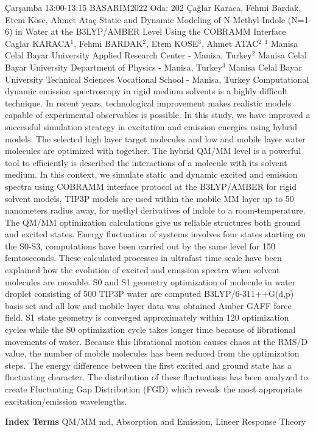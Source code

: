 
    \begin{abstract_basarim}
    {Çarşamba 13:00-13:15}
    {BASARIM2022}
    {Oda: 202}
    {Çağlar Karaca, Fehmi Bardak, Etem Köse, Ahmet Ataç}
    {Static and Dynamic Modeling of N-Methyl-Indole \newline\noindent (N=1-6) in Water at the B3LYP/AMBER Level Using the COBRAMM Interface}
    {%
    Caglar KARACA$^{1}$, Fehmi BARDAK$^{2}$, Etem KOSE$^{3}$, Ahmet ATAC$^{2}$}
    {%
    }
    {%
    $^1$ Manisa Celal Bayar University Applied Research Center - Manisa, Turkey\newline{}$^2$ Manisa Celal Bayar University Department of Physics - Manisa, Turkey\newline{}$^3$ Manisa Celal Bayar University Technical Sciences Vocational School - Manisa, Turkey}
    Computational dynamic emission spectroscopy in rigid medium solvents is a highly difficult technique. In recent years, technological improvement makes realistic models capable of experimental observables is possible. In this study, we have improved a successful simulation strategy in excitation and emission energies using hybrid models. The selected high layer target molecules and low and mobile layer water molecules are optimized with together. The hybrid QM/MM level is a powerful tool to efficiently is described the interactions of a molecule with its solvent medium. In this context, we simulate static and dynamic excited and emission spectra using COBRAMM interface protocol at the B3LYP/AMBER for rigid solvent models, TIP3P models are used within the mobile MM layer up to 50 nanometers radius away, for methyl derivatives of indole to a room-temperature. The QM/MM optimization calculations give us reliable structures both ground and excited states. Energy fluctuation of systems involves four states starting on the S0-S3, computations have been carried out by the same level for 150 femtoseconds. These calculated processes in ultrafast time scale have been explained how the evolution of excited and emission spectra when solvent molecules are movable. S0 and S1 geometry optimization of molecule in water droplet consisting of 500 TIP3P water are computed B3LYP/6-311++G(d,p) basis set and all low and mobile layer data was obtained Amber GAFF force field. S1 state geometry is converged approximately within 120 optimization cycles while the S0 optimization cycle takes longer time because of librational movements of water. Because this librational motion causes chaos at the RMS/D value, the number of mobile molecules has been reduced from the optimization steps. The energy difference between the first excited and ground state has a fluctuating character. The distribution of these fluctuations has been analyzed to create Fluctuating Gap Distribution (FGD) which reveals the most appropriate excitation/emission wavelengths. 
    
            \textbf{Index Terms} \newline{}QM/MM md, Absorption and Emission, Lineer Response Theory
    \end{abstract_basarim}
    
